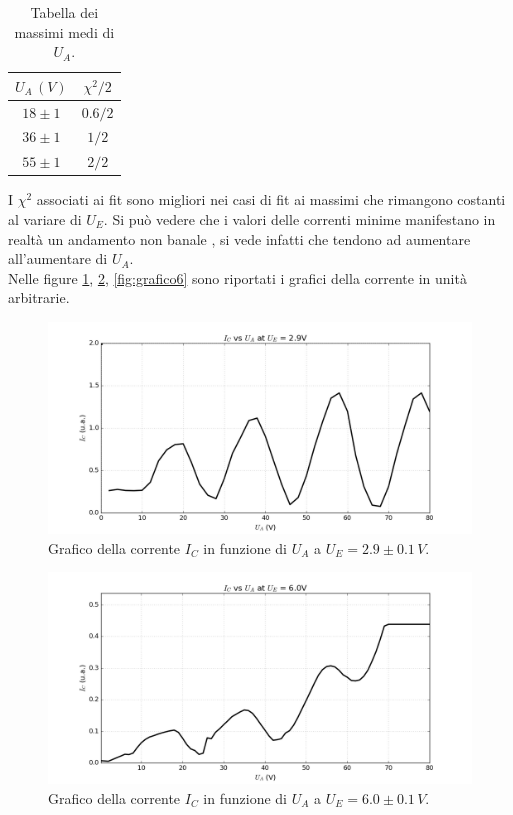 \documentclass[10pt,a4paper]{article}
\begin{document}
\begin{table}[!htb]
\centering
\begin{tabular}{|c|c|}
\hline 
$U_A\,(V)$ & $\chi^2 /2$ \\ 
\hline 
$18\pm1$ & $0.6/2$ \\ 
\hline 
$36\pm1$ & $1/2$ \\ 
\hline 
$55\pm1$ & $2/2$ \\
\hline
\end{tabular}
\caption{Tabella dei massimi medi di $U_A$.\label{tab:tabellaMaxMed}}

\end{table}

I $\chi^2$ associati ai fit sono migliori nei casi di fit ai massimi che rimangono costanti al variare di $U_E$. Si può vedere che i valori delle correnti minime manifestano in realtà un andamento non banale , si vede infatti che tendono ad aumentare all'aumentare di $U_A$.\\
Nelle figure \ref{fig:grafico4}, \ref{fig:grafico5}, \ref{fig:grafico6} sono riportati i grafici della corrente in unità arbitrarie. 

\begin{figure}[!htb]
  \centering
  \includegraphics[scale=.5]{plot29.png}
\caption{Grafico della corrente $I_C$ in funzione di $U_A$ a $U_E = 2.9\pm0.1 \, V$.\label{fig:grafico4}}

\end{figure}

\begin{figure}[!htb]
  \centering
  \includegraphics[scale=.5]{plot60.png}
\caption{Grafico della corrente $I_C$ in funzione di $U_A$ a $U_E = 6.0 \pm 0.1\, V$.\label{fig:grafico5}}

\end{figure}
\end{document}
